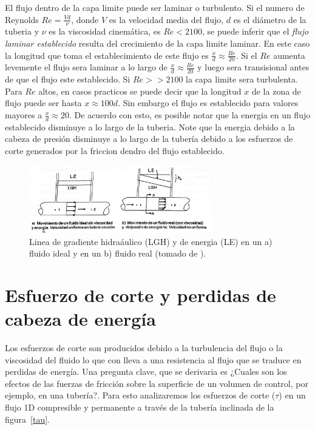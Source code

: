 \documentclass[10pt, oneside]{article}
\begin{document}
El flujo dentro de la capa limite puede ser laminar o turbulento. Si el numero de Reynolds $Re = \frac{Vd}{\nu}$, donde $V$ es la velocidad media del flujo, $d$ es el di\'ametro de la tuberia y $\nu$ es la viscosidad cinem\'atica, es $Re < 2100$, se puede inferir que el \emph{flujo laminar establecido} resulta del crecimiento de la capa limite laminar. En este caso la longitud que toma el establecimiento de este flujo es $\frac{x}{d} \approx \frac{Re}{20}$. Si el $Re$ aumenta levemente el flujo sera laminar a lo largo de $\frac{x}{d} \approx \frac{Re}{20}$ y luego sera transisional antes de que el flujo este establecido. Si $Re >> 2100$ la capa limite sera turbulenta. Para $Re$ altos, en casos practicos se puede decir que la longitud $x$ de la zona de flujo puede ser hasta $x \approx 100 d$. Sin embargo el flujo es establecido para valores mayores a $\frac{x}{d} \approx 20$. De acuerdo con esto, es posible notar que la energia en un flujo establecido disminuye a lo largo de la tuberia. Note que la energia debido a la cabeza de presi\'on disminuye a lo largo de la tuber\'ia debido a los esfuerzos de corte generados por la friccion dendro del flujo establecido. 
  
\begin{figure}[h]
\centering
\includegraphics[width=8cm]{fifr.jpeg}
\caption{Linea de gradiente hidra\'aulico (LGH) y de energia (LE) en un a) fluido ideal y en un b) fluido real (tomado de \cite{agudelo2011mecanica}).}
\label{fifr}
\end{figure}

\section{Esfuerzo de corte y perdidas de cabeza de energ\'ia}
Los esfuerzos de corte son producidos debido a la turbulencia del flujo o la viscosidad del fluido lo que con lleva a una resistencia al flujo que se traduce en perdidas de energ\'ia. Una pregunta clave, que se derivaria es ¿Cuales son los efectos de las fuerzas de fricci\'on sobre la superficie de un volumen de control, por ejemplo,  en una tuber\'ia?. Para esto analizaremos los esfuerzos de corte ($\tau$) en un  flujo 1D compresible y permanente a trav\'es de la tuber\'ia inclinada de la figura~\ref{tau}.
   
\end{document}
